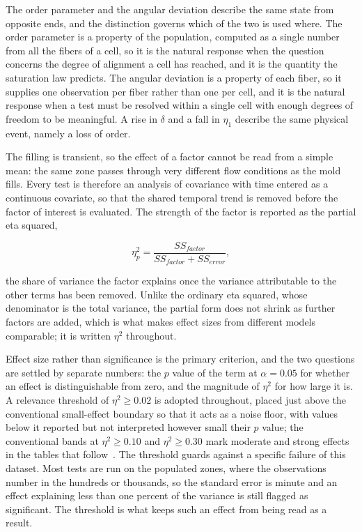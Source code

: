 \documentclass[%
  aip,
  pof,          %
  reprint,      %
  floatfix
]{revtex4-2}
\begin{document}
The order parameter and the angular deviation describe the same state from opposite ends, and the distinction governs which of the two is used where. The order parameter is a property of the population, computed as a single number from all the fibers of a cell, so it is the natural response when the question concerns the degree of alignment a cell has reached, and it is the quantity the saturation law predicts. The angular deviation is a property of each fiber, so it supplies one observation per fiber rather than one per cell, and it is the natural response when a test must be resolved within a single cell with enough degrees of freedom to be meaningful. A rise in $\delta$ and a fall in $\eta_1$ describe the same physical event, namely a loss of order.

The filling is transient, so the effect of a factor cannot be read from a simple mean: the same zone passes through very different flow conditions as the mold fills. Every test is therefore an analysis of covariance with time entered as a continuous covariate, so that the shared temporal trend is removed before the factor of interest is evaluated. The strength of the factor is reported as the partial eta squared,

\begin{equation}
    \eta^2_p = \frac{SS_{factor}}{SS_{factor} + SS_{error}},
    \label{eq:partial_eta_squared}
\end{equation}

the share of variance the factor explains once the variance attributable to the other terms has been removed. Unlike the ordinary eta squared, whose denominator is the total variance, the partial form does not shrink as further factors are added, which is what makes effect sizes from different models comparable; it is written $\eta^2$ throughout.

Effect size rather than significance is the primary criterion, and the two questions are settled by separate numbers: the $p$ value of the term at $\alpha = 0.05$ for whether an effect is distinguishable from zero, and the magnitude of $\eta^2$ for how large it is. A relevance threshold of $\eta^2 \geq 0.02$ is adopted throughout, placed just above the conventional small-effect boundary so that it acts as a noise floor, with values below it reported but not interpreted however small their $p$ value; the conventional bands at $\eta^2 \geq 0.10$ and $\eta^2 \geq 0.30$ mark moderate and strong effects in the tables that follow~\cite{cohen1988}. The threshold guards against a specific failure of this dataset. Most tests are run on the populated zones, where the observations number in the hundreds or thousands, so the standard error is minute and an effect explaining less than one percent of the variance is still flagged as significant. The threshold is what keeps such an effect from being read as a result.
\end{document}
